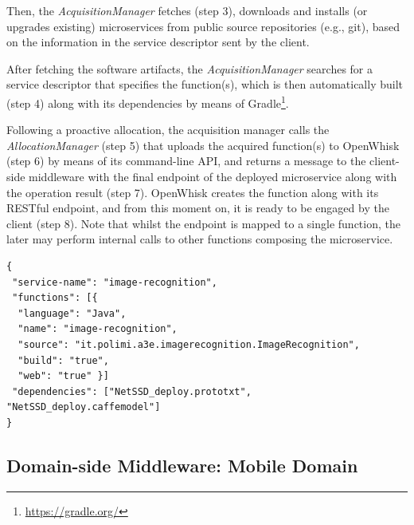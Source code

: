 Then, the \textit{AcquisitionManager} fetches (step 3), downloads and installs (or upgrades existing) microservices from public source repositories (e.g., git), based on the information in the service descriptor sent by the client. 

After fetching the software artifacts, the \textit{AcquisitionManager} searches for a service descriptor that specifies the function(s), which is then automatically built (step 4) along with its dependencies by means of Gradle\footnote{\url{https://gradle.org/}}.





Following a proactive allocation, the acquisition manager calls the \textit{AllocationManager} (step 5) that uploads the acquired function(s) to OpenWhisk (step 6) by means of its command-line API, and returns a message to the client-side middleware with the final endpoint of the deployed microservice along with the operation result (step 7). OpenWhisk creates the function along with its RESTful endpoint, and from this moment on, it is ready to be engaged by the client (step 8). Note that whilst the endpoint is mapped to a single function, the later may perform internal calls to other functions composing the microservice.


\begin{minipage}{.9\linewidth}
	\begin{lstlisting}[caption=Image recognition service descriptor, label=lst:service-descriptor, captionpos=t]
{
 "service-name": "image-recognition",
 "functions": [{	
  "language": "Java",
  "name": "image-recognition",
  "source": "it.polimi.a3e.imagerecognition.ImageRecognition",
  "build": "true",
  "web": "true" }]
 "dependencies": ["NetSSD_deploy.prototxt", "NetSSD_deploy.caffemodel"]
}
	\end{lstlisting}
\end{minipage}
\subsection{Domain-side Middleware: Mobile Domain}

